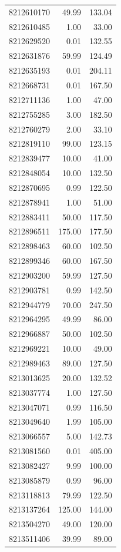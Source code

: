 \documentclass[
]{article}
\begin{document}
\begin{longtable}[]{@{}rrr@{}}
8212610170 & 49.99 & 133.04 \\
8212610485 & 1.00 & 33.00 \\
8212629520 & 0.01 & 132.55 \\
8212631876 & 59.99 & 124.49 \\
8212635193 & 0.01 & 204.11 \\
8212668731 & 0.01 & 167.50 \\
8212711136 & 1.00 & 47.00 \\
8212755285 & 3.00 & 182.50 \\
8212760279 & 2.00 & 33.10 \\
8212819110 & 99.00 & 123.15 \\
8212839477 & 10.00 & 41.00 \\
8212848054 & 10.00 & 132.50 \\
8212870695 & 0.99 & 122.50 \\
8212878941 & 1.00 & 51.00 \\
8212883411 & 50.00 & 117.50 \\
8212896511 & 175.00 & 177.50 \\
8212898463 & 60.00 & 102.50 \\
8212899346 & 60.00 & 167.50 \\
8212903200 & 59.99 & 127.50 \\
8212903781 & 0.99 & 142.50 \\
8212944779 & 70.00 & 247.50 \\
8212964295 & 49.99 & 86.00 \\
8212966887 & 50.00 & 102.50 \\
8212969221 & 10.00 & 49.00 \\
8212989463 & 89.00 & 127.50 \\
8213013625 & 20.00 & 132.52 \\
8213037774 & 1.00 & 127.50 \\
8213047071 & 0.99 & 116.50 \\
8213049640 & 1.99 & 105.00 \\
8213066557 & 5.00 & 142.73 \\
8213081560 & 0.01 & 405.00 \\
8213082427 & 9.99 & 100.00 \\
8213085879 & 0.99 & 96.00 \\
8213118813 & 79.99 & 122.50 \\
8213137264 & 125.00 & 144.00 \\
8213504270 & 49.00 & 120.00 \\
8213511406 & 39.99 & 89.00 \\

\end{longtable}
\end{document}
